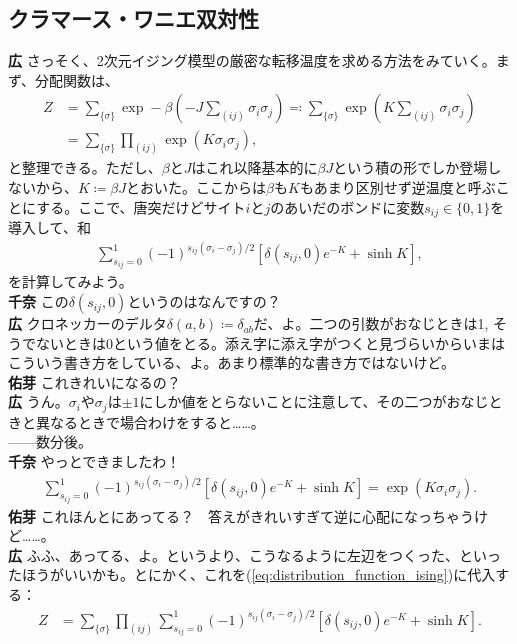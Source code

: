 \documentclass[paper=b5j,fontsize=12Q,jafontsize=12Q,baselineskip=21Q]{jlreq}
\DeclareRobustCommand{\hiron}{\textbf{広 }}
\DeclareRobustCommand{\chinan}{\textbf{千奈 }}
\DeclareRobustCommand{\umen}{\textbf{佑芽 }}
\begin{document}
\begin{refsection}
\subsection{クラマース・ワニエ双対性}
\hiron さっそく、2次元イジング模型の厳密な転移温度を求める方法をみていく。まず、分配関数は、
\begin{align}
  Z&=\sum_{\{\sigma\}}\exp-\beta\left(-J\sum_{(ij)}\sigma_i\sigma_j\right)\eqqcolon\sum_{\{\sigma\}}\exp\left(K\sum_{(ij)}\sigma_i\sigma_j\right)\\
  &=\sum_{\{\sigma\}}\prod_{(ij)}\exp\left(K\sigma_i\sigma_j\right),\label{eq:distribution_function_ising}
\end{align}
と整理できる。ただし、$\beta$と$J$はこれ以降基本的に$\beta J$という積の形でしか登場しないから、$K\coloneqq \beta J$とおいた。ここからは$\beta$も$K$もあまり区別せず逆温度と呼ぶことにする。ここで、唐突だけどサイト$i$と$j$のあいだのボンドに変数$s_{ij}\in\{0,1\}$を導入して、和
\begin{align}
  \sum_{s_{ij}=0}^1(-1)^{s_{ij}(\sigma_i-\sigma_j)/2}\left[\delta(s_{ij},0)e^{-K}+\sinh K\right],
\end{align}
を計算してみよう。
\\\chinan この$\delta(s_{ij},0)$というのはなんですの？
\\\hiron クロネッカーのデルタ$\delta(a,b)\coloneqq\delta_{ab}$だ、よ。二つの引数がおなじときは1, そうでないときは0という値をとる。添え字に添え字がつくと見づらいからいまはこういう書き方をしている、よ。あまり標準的な書き方ではないけど。
\\\umen これきれいになるの？
\\\hiron うん。$\sigma_i$や$\sigma_j$は$\pm 1$にしか値をとらないことに注意して、その二つがおなじときと異なるときで場合わけをすると……。
\\------数分後。
\\\chinan やっとできましたわ！
\begin{align}
  \sum_{s_{ij}=0}^1(-1)^{s_{ij}(\sigma_i-\sigma_j)/2}\left[\delta(s_{ij},0)e^{-K}+\sinh K\right]=\exp\left(K\sigma_i\sigma_j\right).\label{eq:FT_interaction_ising}
\end{align}
\umen これほんとにあってる？　答えがきれいすぎて逆に心配になっちゃうけど……。
\\\hiron ふふ、あってる、よ。というより、こうなるように左辺をつくった、といったほうがいいかも。とにかく、これを(\ref{eq:distribution_function_ising})に代入する：
\begin{align}
  Z&=\sum_{\{\sigma\}}\prod_{(ij)}\sum_{s_{ij}=0}^1(-1)^{s_{ij}(\sigma_i-\sigma_j)/2}\left[\delta(s_{ij},0)e^{-K}+\sinh K\right].

\end{align}
\end{refsection}
\end{document}
